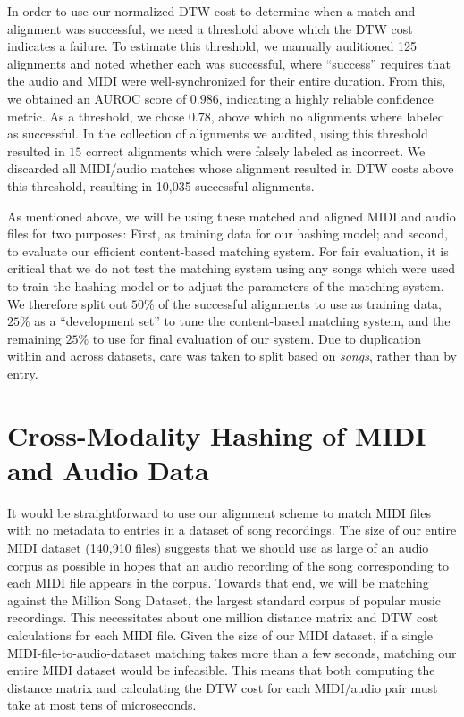 \documentclass{article}
\begin{document}
In order to use our normalized DTW cost to determine when a match and alignment was successful, we need a threshold above which the DTW cost indicates a failure.
To estimate this threshold, we manually auditioned 125 alignments and noted whether each was successful, where ``success'' requires that the audio and MIDI were well-synchronized for their entire duration.
From this, we obtained an AUROC score of $0.986$, indicating a highly reliable confidence metric.
As a threshold, we chose $0.78$, above which no alignments where labeled as successful.
In the collection of alignments we audited, using this threshold resulted in $15$ correct alignments which were falsely labeled as incorrect.
We discarded all MIDI/audio matches whose alignment resulted in DTW costs above this threshold, resulting in 10,035 successful alignments.

As mentioned above, we will be using these matched and aligned MIDI and audio files for two purposes: First, as training data for our hashing model; and second, to evaluate our efficient content-based matching system.
For fair evaluation, it is critical that we do not test the matching system using any songs which were used to train the hashing model or to adjust the parameters of the matching system.
We therefore split out $50\%$ of the successful alignments to use as training data, $25\%$ as a ``development set'' to tune the content-based matching system, and the remaining $25\%$ to use for final evaluation of our system.
Due to duplication within and across datasets, care was taken to split based on \textit{songs}, rather than by entry.

\section{Cross-Modality Hashing of MIDI and Audio Data}
\label{sec:hashing}

It would be straightforward to use our alignment scheme to match MIDI files with no metadata to entries in a dataset of song recordings.
The size of our entire MIDI dataset (140,910 files) suggests that we should use as large of an audio corpus as possible in hopes that an audio recording of the song corresponding to each MIDI file appears in the corpus.
Towards that end, we will be matching against the Million Song Dataset, the largest standard corpus of popular music recordings.
This necessitates about one million distance matrix and DTW cost calculations for each MIDI file.
Given the size of our MIDI dataset, if a single MIDI-file-to-audio-dataset matching takes more than a few seconds, matching our entire MIDI dataset would be infeasible.
This means that both computing the distance matrix and calculating the DTW cost for each MIDI/audio pair must take at most tens of microseconds.
\end{document}
